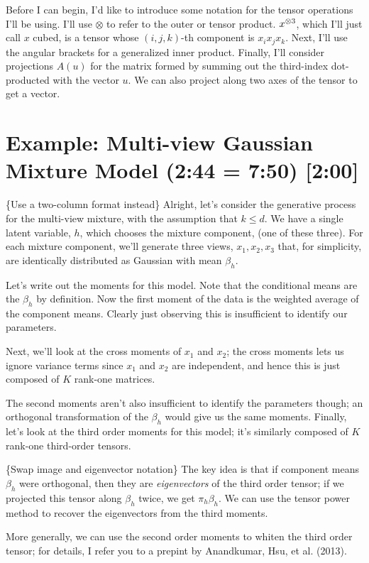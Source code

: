 \documentclass[tablecaption=bottom]{jmlr}
\begin{document}
Before I can begin, I'd like to introduce some notation for the tensor
operations I'll be using. I'll use $\otimes$ to refer to the outer or
tensor product. $x^{\otimes3}$, which I'll just call $x$ cubed, is a tensor
whose $(i,j,k)$-th component is $x_i x_j x_k$. Next, I'll use the
angular brackets for a generalized inner product. Finally, I'll consider
projections $A(u)$ for the matrix formed by summing out the third-index
dot-producted with the vector $u$. We can also project along two axes of
the tensor to get a vector.

\section{Example: Multi-view Gaussian Mixture Model (2:44 = 7:50)
{[}2:00{]}}

\{Use a two-column format instead\} Alright, let's consider the
generative process for the multi-view mixture, with the assumption that
$k \le d$. We have a single latent variable, $h$, which chooses the
mixture component, (one of these three). For each mixture component,
we'll generate three views, $x_1, x_2, x_3$ that, for simplicity, are
identically distributed as Gaussian with mean $\beta_h$.

Let's write out the moments for this model. Note that the conditional
means are the $\beta_h$ by definition. Now the first moment of the data
is the weighted average of the component means. Clearly just observing
this is insufficient to identify our parameters.

Next, we'll look at the cross moments of $x_1$ and $x_2$; the cross
moments lets us ignore variance terms since $x_1$ and $x_2$ are
independent, and hence this is just composed of $K$ rank-one matrices.

The second moments aren't also insufficient to identify the parameters
though; an orthogonal transformation of the $\beta_h$ would give us the
same moments. Finally, let's look at the third order moments for this
model; it's similarly composed of $K$ rank-one third-order tensors.

\{Swap image and eigenvector notation\} The key idea is that if
component means $\beta_h$ were orthogonal, then they are
\emph{eigenvectors} of the third order tensor; if we projected this
tensor along $\beta_h$ twice, we get $\pi_h \beta_h$. We can use the
tensor power method to recover the eigenvectors from the third moments.

More generally, we can use the second order moments to whiten the third
order tensor; for details, I refer you to a prepint by Anandkumar, Hsu,
et al. (2013).
\end{document}
